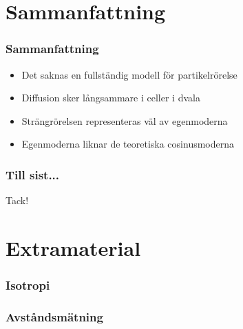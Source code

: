 \documentclass[swedish]{beamer}
\begin{document}
\section{Sammanfattning}
\begin{frame}
\frametitle{Sammanfattning}

\begin{itemize}[label={$\bullet$}]
    
 \item{Det saknas en fullständig modell för partikelrörelse}
\\[8mm]
 \item{Diffusion sker långsammare i celler i dvala}
\\[8mm]
 \item{Strängrörelsen representeras väl av egenmoderna}
\\[8mm]
\item{Egenmoderna liknar de teoretiska cosinusmoderna}

\end{itemize}

\end{frame}


\begin{frame}
\frametitle{Till sist...}
    \begin{center}
    \huge Tack! 
    \end{center}
\end{frame}

\section{Extramaterial}
\begin{frame}
\frametitle{Isotropi}
\begin{figure}
\resizebox{1\textwidth}{!}{  }
\end{figure}
\end{frame}

\begin{frame}
\frametitle{Avståndsmätning}

\begin{figure}
\resizebox{1\textwidth}{!}{  }
\end{figure}

\end{frame}
\end{document}
